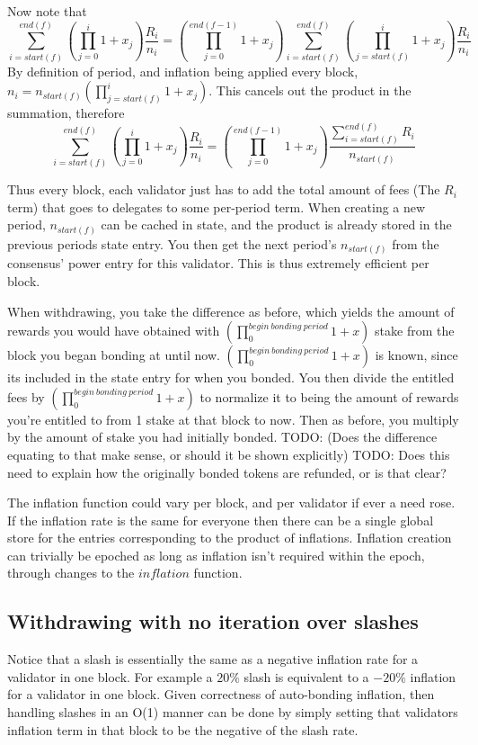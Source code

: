 \documentclass[]{article}
\begin{document}
Now note that 
$$\sum_{i = start(f)}^{end(f)}\left(\prod_{j = 0}^{i} 1 + x_j \right) \frac{R_i}{n_i} = \left(\prod_{j = 0}^{end(f - 1)} 1 + x_j \right)\sum_{i = start(f)}^{end(f)}\left(\prod_{j = start(f)}^{i} 1 + x_j \right) \frac{R_i}{n_i}$$
By definition of period, and inflation being applied every block, \\
$n_i = n_{start(f)}\left(\prod_{j = start(f)}^{i} 1 + x_j \right)$. This cancels out the product in the summation, therefore
$$\sum_{i = start(f)}^{end(f)}\left(\prod_{j = 0}^{i} 1 + x_j \right) \frac{R_i}{n_i} = \left(\prod_{j = 0}^{end(f - 1)} 1 + x_j \right)\frac{\sum_{i = start(f)}^{end(f)}R_i}{n_{start(f)}}$$

Thus every block, each validator just has to add the total amount of fees (The $R_i$ term) that goes to delegates to some per-period term.
When creating a new period, $n_{start(f)}$ can be cached in state, and the product is already stored in the previous periods state entry.
You then get the next period's $n_{start(f)}$ from the consensus' power entry for this validator. 
This is thus extremely efficient per block.

When withdrawing, you take the difference as before,
which yields the amount of rewards you would have obtained with $(\prod_0^{begin\ bonding\ period}1 + x)$ stake from the block you began bonding at until now.
$(\prod_0^{begin\ bonding\ period}1 + x)$ is known, since its included in the state entry for when you bonded.
You then divide the entitled fees by $(\prod_0^{begin\ bonding\ period}1 + x)$ to normalize it to being the amount of rewards you're entitled to from 1 stake at that block to now.
Then as before, you multiply by the amount of stake you had initially bonded.
TODO: (Does the difference equating to that make sense, or should it be shown explicitly)
TODO: Does this need to explain how the originally bonded tokens are refunded, or is that clear?

The inflation function could vary per block,
and per validator if ever a need rose. 
If the inflation rate is the same for everyone then there can be a single global store for the entries corresponding to the product of inflations.
Inflation creation can trivially be epoched as long as inflation isn't required within the epoch, through changes to the $inflation$ function.

\subsection{Withdrawing with no iteration over slashes}
Notice that a slash is essentially the same as a negative inflation rate for a validator in one block. For example a $20\%$ slash is equivalent to a $-20\%$ inflation for a validator in one block. Given correctness of auto-bonding inflation, then handling slashes in an O(1) manner can be done by simply setting that validators inflation term in that block to be the negative of the slash rate.
\end{document}
